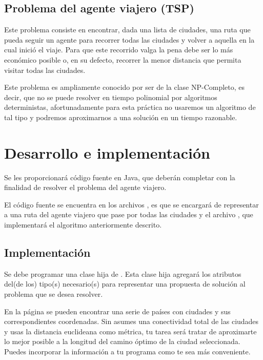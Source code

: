 \subsection{Problema del agente viajero (TSP)}

Este problema consiste en encontrar, dada una lista de ciudades, una ruta que pueda seguir un agente para recorrer todas las ciudades y volver a aquella en la cual inició el viaje.  Para que este recorrido valga la pena debe ser lo más económico posible o, en su defecto, recorrer la menor distancia que permita visitar todas las ciudades.

Este problema es ampliamente conocido por ser de la clase NP-Completo, es decir, que no se puede resolver en tiempo polinomial por algoritmos deterministas, afortunadamente para esta práctica no usaremos un algoritmo de tal tipo y podremos aproximarnos a una solución en un tiempo razonable.



\section{Desarrollo e implementaci\'on}

Se les proporcionará código fuente en Java, que deberán completar con la finalidad de resolver el problema del agente viajero.

El código fuente se encuentra en los archivos , es que se encargará de representar a una ruta del agente viajero que pase por todas las ciudades y el archivo , que implementará el algoritmo anteriormente descrito.

\subsection{Implementaci\'on}

Se debe programar una clase hija de .  Esta clase hija agregará los atributos del(de los) tipo(s) necesario(s) para representar una propuesta de solución al problema que se desea resolver.

En la página  se pueden encontrar una serie de países con ciudades y sus correspondientes coordenadas.  Sin asumes una conectividad total de las ciudades y usas la distancia euclideana como métrica, tu tarea será tratar de aproximarte lo mejor posible a la longitud del camino óptimo de la ciudad seleccionada.  Puedes incorporar la información a tu programa como te sea más conveniente.


